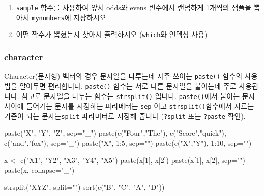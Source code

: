 \documentclass[
]{book}
\newenvironment{Shaded}{\begin{snugshade}}{\end{snugshade}}
\newcommand{\AttributeTok}[1]{\textcolor[rgb]{0.77,0.63,0.00}{#1}}
\newcommand{\DecValTok}[1]{\textcolor[rgb]{0.00,0.00,0.81}{#1}}
\newcommand{\FunctionTok}[1]{\textcolor[rgb]{0.00,0.00,0.00}{#1}}
\newcommand{\NormalTok}[1]{#1}
\newcommand{\OtherTok}[1]{\textcolor[rgb]{0.56,0.35,0.01}{#1}}
\newcommand{\SpecialCharTok}[1]{\textcolor[rgb]{0.00,0.00,0.00}{#1}}
\newcommand{\StringTok}[1]{\textcolor[rgb]{0.31,0.60,0.02}{#1}}
\begin{document}
\begin{enumerate}
\def\labelenumi{\arabic{enumi}.}
\setcounter{enumi}{1}
\item
  \texttt{sample} 함수를 사용하여 앞서 odds와 evens 변수에서 랜덤하게 1개씩의 샘플을 뽑아서 \texttt{mynumbers}에 저장하시오
\item
  어떤 짝수가 뽑혔는지 찾아서 출력하시오 (\texttt{which}와 인덱싱 사용)
\end{enumerate}

\hypertarget{character}{%
\subsubsection{character}\label{character}}

Character(문자형) 벡터의 경우 문자열을 다루는데 자주 쓰이는 \texttt{paste()} 함수의 사용법을 알아두면 편리합니다. \texttt{paste()} 함수는 서로 다른 문자열을 붙이는데 주로 사용됩니다. 참고로 문자열을 나누는 함수는 \texttt{strsplit()} 입니다. \texttt{paste()}에서 붙이는 문자 사이에 들어가는 문자를 지정하는 파라메터는 \texttt{sep} 이고 \texttt{strsplit()}함수에서 자르는 기준이 되는 문자는\texttt{split} 파라미터로 지정해 줍니다 (\texttt{?split} 또는 \texttt{?paste} 확인).

\begin{Shaded}
\begin{Highlighting}[]
\FunctionTok{paste}\NormalTok{(}\StringTok{"X"}\NormalTok{, }\StringTok{"Y"}\NormalTok{, }\StringTok{"Z"}\NormalTok{, }\AttributeTok{sep=}\StringTok{"\_"}\NormalTok{)}
\FunctionTok{paste}\NormalTok{(}\FunctionTok{c}\NormalTok{(}\StringTok{"Four"}\NormalTok{,}\StringTok{"The"}\NormalTok{), }\FunctionTok{c}\NormalTok{(}\StringTok{"Score"}\NormalTok{,}\StringTok{"quick"}\NormalTok{), }\FunctionTok{c}\NormalTok{(}\StringTok{"and"}\NormalTok{,}\StringTok{"fox"}\NormalTok{), }\AttributeTok{sep=}\StringTok{"\_"}\NormalTok{)}
\FunctionTok{paste}\NormalTok{(}\StringTok{"X"}\NormalTok{, }\DecValTok{1}\SpecialCharTok{:}\DecValTok{5}\NormalTok{, }\AttributeTok{sep=}\StringTok{""}\NormalTok{)}
\FunctionTok{paste}\NormalTok{(}\FunctionTok{c}\NormalTok{(}\StringTok{"X"}\NormalTok{,}\StringTok{"Y"}\NormalTok{), }\DecValTok{1}\SpecialCharTok{:}\DecValTok{10}\NormalTok{, }\AttributeTok{sep=}\StringTok{""}\NormalTok{)}

\NormalTok{x }\OtherTok{\textless{}{-}} \FunctionTok{c}\NormalTok{(}\StringTok{"X1"}\NormalTok{, }\StringTok{"Y2"}\NormalTok{, }\StringTok{"X3"}\NormalTok{, }\StringTok{"Y4"}\NormalTok{, }\StringTok{"X5"}\NormalTok{)}
\FunctionTok{paste}\NormalTok{(x[}\DecValTok{1}\NormalTok{], x[}\DecValTok{2}\NormalTok{])}
\FunctionTok{paste}\NormalTok{(x[}\DecValTok{1}\NormalTok{], x[}\DecValTok{2}\NormalTok{], }\AttributeTok{sep=}\StringTok{""}\NormalTok{)}
\FunctionTok{paste}\NormalTok{(x, }\AttributeTok{collapse=}\StringTok{"\_"}\NormalTok{)}

\FunctionTok{strsplit}\NormalTok{(}\StringTok{"XYZ"}\NormalTok{, }\AttributeTok{split=}\StringTok{""}\NormalTok{)}
\FunctionTok{sort}\NormalTok{(}\FunctionTok{c}\NormalTok{(}\StringTok{"B"}\NormalTok{, }\StringTok{"C"}\NormalTok{, }\StringTok{"A"}\NormalTok{, }\StringTok{"D"}\NormalTok{))}
\end{Highlighting}
\end{Shaded}
\end{document}
